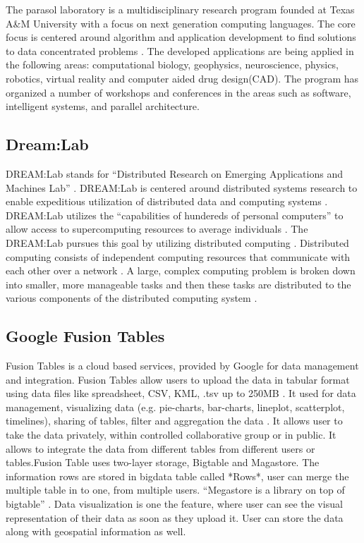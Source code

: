     The parasol laboratory is a multidisciplinary research program 
    founded at Texas A\&M University with a focus on next generation 
    computing languages.  The core focus is centered around algorithm 
    and application development to find solutions to data concentrated 
    problems \cite{www-parasol}. The developed applications are being 
    applied in the following areas: computational biology, geophysics, 
    neuroscience, physics, robotics, virtual reality and computer aided 
    drug design(CAD).  The program has organized a number of workshops 
    and conferences in the areas such as software, intelligent systems, 
    and parallel architecture.
    
\subsection{Dream:Lab}

    DREAM:Lab stands for ``Distributed Research on Emerging
    Applications and Machines Lab'' \cite{dream}. DREAM:Lab is
    centered around distributed systems research to enable expeditious
    utilization of distributed data and computing
    systems \cite{dream}. DREAM:Lab utilizes the ``capabilities of
    hundereds of personal computers'' to allow access to supercomputing
    resources to average individuals \cite{rao}. The DREAM:Lab
    pursues this goal by utilizing distributed computing \cite{rao}.
    Distributed computing consists of independent computing resources
    that communicate with each other over a network \cite{denero}. A
    large, complex computing problem is broken down into smaller, more
    manageable tasks and then these tasks are distributed to the
    various components of the distributed computing
    system \cite{denero}.

    \pv
    
\subsection{Google Fusion Tables}
    
    Fusion Tables is a cloud based services, provided by Google for
    data management and integration. Fusion Tables allow users to
    upload the data in tabular format using data files like
    spreadsheet, CSV, KML, .tsv up to
    250MB \cite{www-FusionTableSupport}. It used for data management,
    visualizing data (e.g. pie-charts, bar-charts, lineplot,
    scatterplot, timelines), sharing of
    tables, filter and aggregation the data \cite{wiki-FusionTable}.
    It allows user to take
    the data privately, within controlled collaborative group or in
    public. It allows to integrate the data from different tables from
    different users or tables.Fusion Table uses two-layer storage,
    Bigtable and Magastore. The information rows are stored in bigdata
    table called *Rows*, user can merge the multiple table in to one,
    from multiple users. ``Megastore is a library on top of
    bigtable'' \cite{GoogleFusionTable2012}. Data visualization is one
    the feature, where user can see the visual representation of their
    data as soon as they upload it. User can store the data along with
    geospatial information as well.

